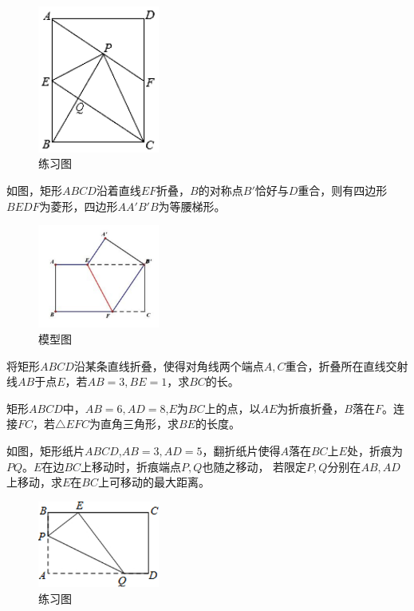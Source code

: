 \documentclass{ecnuthesis}
\begin{document}
\begin{figure}[H]
\centering
\includegraphics[width=4cm]{picture/6121.png}
\caption{练习图}
\end{figure}
\begin{model}
    如图，矩形$ABCD$沿着直线$EF$折叠，$B$的对称点$B'$恰好与$D$重合，则有四边形$BEDF$为菱形，四边形$AA'B'B$为等腰梯形。
\end{model}
\begin{figure}[H]
\centering
\includegraphics[width=4cm]{picture/6132.png}
\caption{模型图}
\end{figure}
\begin{problem}
    将矩形$ABCD$沿某条直线折叠，使得对角线两个端点$A,C$重合，折叠所在直线交射线$AB$于点$E$，若$AB=3,BE=1$，求$BC$的长。
\end{problem}
\begin{problem}
    矩形$ABCD$中，$AB=6,AD=8$,$E$为$BC$上的点，以$AE$为折痕折叠，$B$落在$F$。连接$FC$，若$\triangle EFC$为直角三角形，求$BE$的长度。
\end{problem}
\begin{problem}
    如图，矩形纸片$ABCD$,$AB=3,AD=5$，翻折纸片使得$A$落在$BC$上$E$处，折痕为$PQ$。$E$在边$BC$上移动时，折痕端点$P,Q$也随之移动，
    若限定$P,Q$分别在$AB,AD$上移动，求$E$在$BC$上可移动的最大距离。
\end{problem}
\begin{figure}[H]
\centering
\includegraphics[width=4cm]{picture/676.png}
\caption{练习图}
\end{figure}
\clearpage
\end{document}
